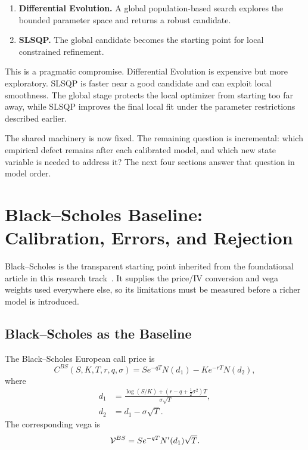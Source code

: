 \begin{enumerate}[leftmargin=8mm, itemsep=2pt]
    \item \textbf{Differential Evolution.} A global population-based search explores the bounded parameter space and returns a robust candidate.
    \item \textbf{SLSQP.} The global candidate becomes the starting point for local constrained refinement.
\end{enumerate}

This is a pragmatic compromise. Differential Evolution is expensive but more exploratory. SLSQP is faster near a good candidate and can exploit local smoothness. The global stage protects the local optimizer from starting too far away, while SLSQP improves the final local fit under the parameter restrictions described earlier.

The shared machinery is now fixed. The remaining question is incremental: which empirical defect remains after each calibrated model, and which new state variable is needed to address it? The next four sections answer that question in model order.

\section{Black--Scholes Baseline: Calibration, Errors, and Rejection}

Black--Scholes is the transparent starting point inherited from the foundational article in this research track~\cite{team1}. It supplies the price/IV conversion and vega weights used everywhere else, so its limitations must be measured before a richer model is introduced.

\subsection{Black--Scholes as the Baseline}

The Black--Scholes European call price is
\begin{equation}
    C^{BS}(S,K,T,r,q,\sigma)
    =
    S e^{-qT}N(d_1)-K e^{-rT}N(d_2),
\end{equation}
where
\begin{align}
    d_1 &=
    \frac{\log(S/K)+(r-q+\frac{1}{2}\sigma^2)T}{\sigma\sqrt{T}},\\
    d_2 &= d_1-\sigma\sqrt{T}.
\end{align}
The corresponding vega is
\begin{equation}
    \mathcal{V}^{BS}
    =
    S e^{-qT} N'(d_1)\sqrt{T}.
\end{equation}

